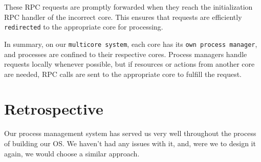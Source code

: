 These RPC requests are promptly forwarded when they reach the initialization RPC handler of the incorrect core. This ensures that requests are efficiently \texttt{redirected} to the appropriate core for processing.

In summary, on our \texttt{multicore system}, each core has its \texttt{own process manager}, and processes are confined to their respective cores. Process managers handle requests locally whenever possible, but if resources or actions from another core are needed, RPC calls are sent to the appropriate core to fulfill the request.

\section{Retrospective}
Our process management system has served us very well throughout the process of building our OS. We haven't had any issues with it, and, were we to design it again, we would choose a similar approach.
